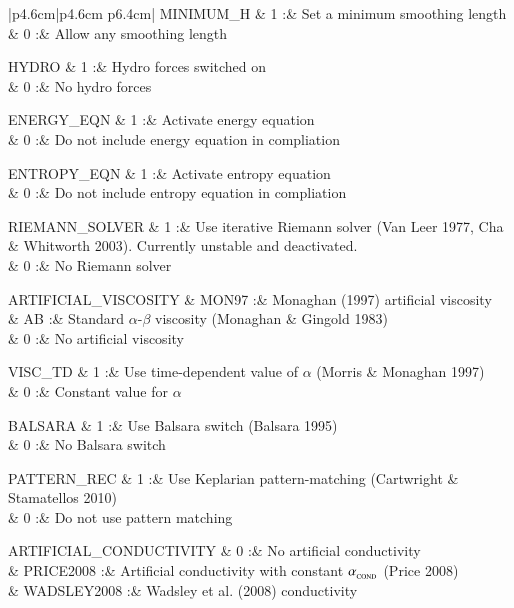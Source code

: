 \documentclass[a4paper]{article}
\begin{document}
\begin{center}
\begin{supertabular}{|p{4.6cm}|p{4.6cm} p{6.4cm}|}
 MINIMUM\_H    & 1 :& Set a minimum smoothing length \\
               & 0 :& Allow any smoothing length \\ \hline

 HYDRO         & 1 :& Hydro forces switched on \\
               & 0 :& No hydro forces \\ \hline

 ENERGY\_EQN   & 1 :& Activate energy equation \\
               & 0 :& Do not include energy equation in compliation \\ \hline

 ENTROPY\_EQN  & 1 :& Activate entropy equation \\
               & 0 :& Do not include entropy equation in compliation \\ \hline

 RIEMANN\_SOLVER & 1   :& Use iterative Riemann solver (Van Leer 1977, Cha \& Whitworth 2003).  Currently unstable and deactivated.\\
                 & 0   :& No Riemann solver \\ \hline

 ARTIFICIAL\_VISCOSITY  & MON97 :& Monaghan (1997) artificial viscosity \\
               & AB    :& Standard $\alpha$-$\beta$ viscosity (Monaghan \& Gingold 1983)\\
               & 0     :& No artificial viscosity \\ \hline

 VISC\_TD      & 1  :& Use time-dependent value of $\alpha$ (Morris \& Monaghan 1997)\\
               & 0  :& Constant value for $\alpha$ \\ \hline

 BALSARA       & 1  :& Use Balsara switch (Balsara 1995) \\
               & 0  :& No Balsara switch \\ \hline

 PATTERN\_REC  & 1 :& Use Keplarian pattern-matching (Cartwright \& Stamatellos 2010) \\
               & 0 :& Do not use pattern matching \\ \hline

 ARTIFICIAL\_CONDUCTIVITY  & 0         :& No artificial conductivity \\
                           & PRICE2008 :& Artificial conductivity with constant $\alpha_{_{\rm COND}}$ (Price 2008)\\ 
                           & WADSLEY2008 :& Wadsley et al. (2008) conductivity\\ \hline


\end{supertabular}
\end{center}
\end{document}
